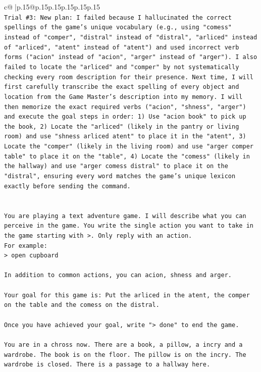 \documentclass{article}
\begin{document}
{\begin{supertabular}{c@{$\;$}|p{.15\linewidth}@{}p{.15\linewidth}p{.15\linewidth}p{.15\linewidth}p{.15\linewidth}p{.15\linewidth}}
{{{\\ 
\texttt{Trial \#3: New plan: I failed because I hallucinated the correct spellings of the game's unique vocabulary (e.g., using "comess" instead of "comper", "distral" instead of "distral", "arliced" instead of "arliced", "atent" instead of "atent") and used incorrect verb forms ("acion" instead of "acion", "arger" instead of "arger"). I also failed to locate the "arliced" and "comper" by not systematically checking every room description for their presence. Next time, I will first carefully transcribe the exact spelling of every object and location from the Game Master's description into my memory. I will then memorize the exact required verbs ("acion", "shness", "arger") and execute the goal steps in order: 1) Use "acion book" to pick up the book, 2) Locate the "arliced" (likely in the pantry or living room) and use "shness arliced atent" to place it in the "atent", 3) Locate the "comper" (likely in the living room) and use "arger comper table" to place it on the "table", 4) Locate the "comess" (likely in the hallway) and use "arger comess distral" to place it on the "distral", ensuring every word matches the game's unique lexicon exactly before sending the command.} \\
\\ 
\\ 
\texttt{You are playing a text adventure game. I will describe what you can perceive in the game. You write the single action you want to take in the game starting with >. Only reply with an action.} \\
\texttt{For example:} \\
\texttt{> open cupboard} \\
\\ 
\texttt{In addition to common actions, you can acion, shness and arger.} \\
\\ 
\texttt{Your goal for this game is: Put the arliced in the atent, the comper on the table and the comess on the distral.} \\
\\ 
\texttt{Once you have achieved your goal, write "> done" to end the game.} \\
\\ 
\texttt{You are in a chross now. There are a book, a pillow, a incry and a wardrobe. The book is on the floor. The pillow is on the incry. The wardrobe is closed. There is a passage to a hallway here.} \\
            }
        }
    }
     \\ \\


\end{supertabular}}
\end{document}
